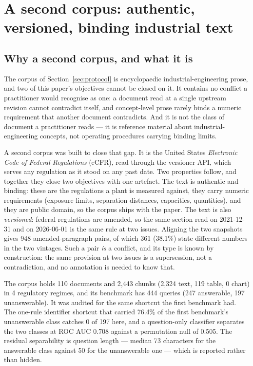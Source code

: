 \documentclass[preprint,3p,times]{elsarticle}
\begin{document}
\section{A second corpus: authentic, versioned, binding industrial text}
\label{sec:industrial}

\subsection{Why a second corpus, and what it is}

The corpus of Section~\ref{sec:protocol} is encyclopaedic
industrial-engineering prose, and two of this paper's objectives cannot be
closed on it. It contains no conflict a practitioner would recognise as one:
a document read at a single upstream revision cannot contradict itself, and
concept-level prose rarely binds a numeric requirement that another document
contradicts. And it is not the class of document a practitioner reads --- it
is reference material about industrial-engineering concepts, not operating
procedures carrying binding limits.

A second corpus was built to close that gap. It is the United States
\emph{Electronic Code of Federal Regulations} (eCFR), read through the
versioner API, which serves any regulation as it stood on any past date. Two
properties follow, and together they close two objectives with one artefact.
The text is authentic and binding: these are the regulations a plant is
measured against, they carry numeric requirements (exposure limits,
separation distances, capacities, quantities), and they are public domain, so
the corpus ships with the paper. The text is also \emph{versioned}: federal
regulations are amended, so the same section read on
2021-12-31 and on 2026-06-01 is the same rule at two
issues. Aligning the two snapshots gives 948
amended-paragraph pairs, of which
361
(38.1\%) state different
numbers in the two vintages. Such a pair \emph{is} a conflict, and its type
is known by construction: the same provision at two issues is a supersession,
not a contradiction, and no annotation is needed to know that.

The corpus holds 110 documents and 2,443 chunks
(2,324 text,
119 table,
0 chart) in 4 regulatory
regimes, and its benchmark has 444 queries
(247 answerable, 197
unanswerable). It was audited for the same shortcut the first benchmark had.
The one-rule identifier shortcut that carried 76.4\% of the first benchmark's
unanswerable class catches
0 of
197 here, and a question-only classifier separates the
two classes at ROC AUC 0.708 against a permutation null of
0.505. The residual separability is question
length --- median 73 characters for the
answerable class against 50 for the
unanswerable one --- which is reported rather than hidden.
\end{document}
